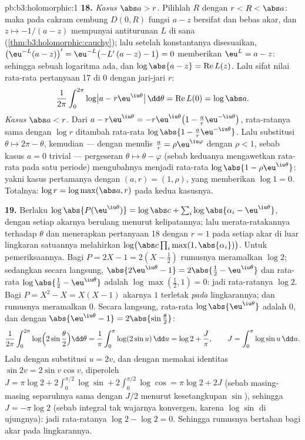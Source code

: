 \begin{solution}{pb:b3:holomorphic:1}
\textbf{18.} \emph{Kasus $\abs a > r$.} Pilihlah $R$ dengan $r < R
< \abs a$: maka pada cakram cembung $D(0, R)$ fungsi $a - z$
bersifat  dan bebas akar, dan $z \mapsto -1/(a - z)$ mempunyai
antiturunan $L$ di sana (\cref{thm:b3:holomorphic:cauchy});
lalu setelah konstantanya disesuaikan, $\bigl(\eu^{-L}(a -
z)\bigr)' = \eu^{-L}\bigl(-L'\,(a - z) - 1\bigr) = 0$ memberikan
$\eu^L = a - z$: sehingga sebuah logaritma  ada, dan
$\log\abs{a - z} = \operatorname{Re}L(z)$. Lalu sifat nilai rata-rata
pertanyaan 17 di $0$ dengan jari-jari $r$:
\[
\frac1{2\pi}\int_0^{2\pi}
\log\bigl|a - r\eu^{\iu\theta}\bigr|\,\dd\theta
= \operatorname{Re}L(0) = \log\abs a .
\]
\emph{Kasus $\abs a < r$.} Dari $a - r\eu^{\iu\theta} =
-r\eu^{\iu\theta}\bigl(1 - \frac ar\eu^{-\iu\theta}\bigr)$,
rata-ratanya sama dengan $\log r$ ditambah rata-rata $\log\abs{1 -
\frac ar\eu^{-\iu\theta}}$. Lalu substitusi $\theta \mapsto
2\pi - \theta$, kemudian --- dengan menulis $\frac ar =
\rho\eu^{\iu\varphi}$ dengan $\rho < 1$, sebab kasus $a = 0$
trivial --- pergeseran $\theta \mapsto \theta - \varphi$
(sebab keduanya mengawetkan rata-rata pada satu periode) mengubahnya menjadi rata-rata
$\log\abs{1 - \rho\eu^{\iu\theta}}$: yakni kasus pertamanya dengan
$(a, r) = (1, \rho)$, yang memberikan $\log 1 = 0$. Totalnya:
$\log r = \log\max(\abs a, r)$ pada kedua kasusnya.

\textbf{19.} Berlaku $\log\abs{P(\eu^{\iu\theta})} = \log\abs c +
\sum_i\log\abs{\alpha_i - \eu^{\iu\theta}}$, dengan setiap akarnya
berulang menurut kelipatannya; lalu merata-ratakannya terhadap $\theta$ dan
menerapkan pertanyaan 18 dengan $r = 1$ pada setiap akar di luar lingkaran
satuannya melahirkan $\log\bigl(\abs c\prod_i\max(1,
\abs{\alpha_i})\bigr)$. Untuk pemeriksaannya. Bagi $P = 2X - 1 = 2(X -
\frac12)$ rumusnya meramalkan $\log 2$; sedangkan secara langsung,
$\abs{2\eu^{\iu\theta} - 1} = 2\abs{\frac12 -
\eu^{\iu\theta}}$ dan rata-rata $\log\abs{\frac12 -
\eu^{\iu\theta}}$ adalah $\log\max(\frac12, 1) = 0$: jadi rata-ratanya $\log
2$. Bagi $P = X^2 - X = X(X - 1)$ akarnya $1$ terletak \emph{pada}
lingkarannya; dan rumusnya meramalkan $0$. Secara langsung, rata-rata
$\log\abs{\eu^{\iu\theta}}$ adalah $0$, dan dengan
$\abs{\eu^{\iu\theta} - 1} = 2\abs{\sin\frac\theta2}$:
\[
\frac1{2\pi}\int_0^{2\pi}
\log\Bigl(2\sin\frac\theta2\Bigr)\dd\theta
= \frac1\pi\int_0^\pi\log(2\sin u)\,\dd u
= \log 2 + \frac J\pi,
\qquad J = \int_0^\pi\log\sin u\,\dd u .
\]
Lalu dengan substitusi $u = 2v$, dan dengan memakai identitas
$\sin 2v = 2\sin v\cos v$, diperoleh
$J = \pi\log2 + 2\int_0^{\pi/2}\log\sin +
2\int_0^{\pi/2}\log\cos = \pi\log 2 + 2J$ (sebab masing-masing separuhnya sama dengan
$J/2$ menurut kesetangkupan $\sin$), sehingga $J = -\pi\log 2$ (sebab
integral tak wajarnya konvergen, karena $\log\sin$  di
ujungnya): jadi rata-ratanya $\log2 - \log2 = 0$. Sehingga rumusnya
bertahan bagi akar pada lingkarannya.


\end{solution}
